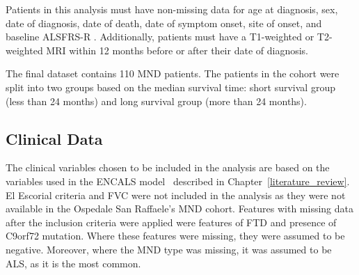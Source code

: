 Patients in this analysis must have non-missing data for age at diagnosis, sex, date of diagnosis, date of death, date of symptom onset, site of onset, and baseline ALSFRS-R .
Additionally, patients must have a T1-weighted or T2-weighted MRI within 12 months before or after their date of diagnosis.

The final dataset contains 110 MND patients.
The patients in the cohort were split into two groups based on the median survival time: short survival group (less than 24 months) and long survival group (more than 24 months).

\subsection{Clinical Data}

The clinical variables chosen to be included in the analysis are based on the variables used in the ENCALS model~\cite{westenengPrognosisPatientsAmyotrophic2018} described in Chapter~\ref{literature_review}.
El Escorial criteria and FVC were not included in the analysis as they were not available in the Ospedale San Raffaele's MND cohort.
Features with missing data after the inclusion criteria were applied were features of FTD and presence of C9orf72 mutation.
Where these features were missing, they were assumed to be negative.
Moreover, where the MND type was missing, it was assumed to be ALS, as it is the most common.



